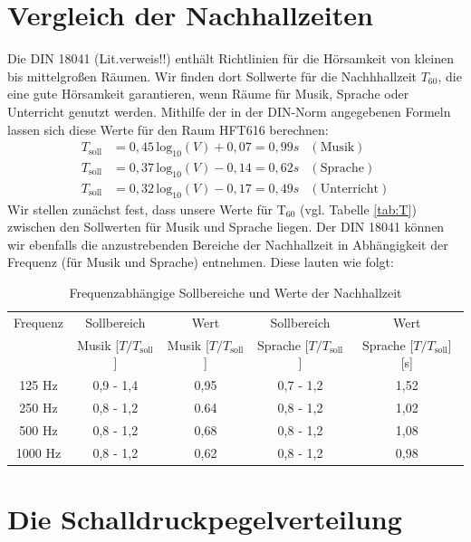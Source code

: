 \section{Vergleich der Nachhallzeiten}
\label{sec:ts}
Die DIN 18041 (Lit.verweis!!) enthält Richtlinien für die Hörsamkeit von kleinen bis mittelgroßen Räumen. 
Wir finden dort Sollwerte für die Nachhhallzeit $T_{60}$, die eine gute Hörsamkeit garantieren, wenn Räume für Musik, Sprache oder Unterricht genutzt werden.
Mithilfe der in der DIN-Norm angegebenen Formeln lassen sich diese Werte für den Raum HFT616 berechnen:
\begin{align*}
T_{\mathrm{soll}} &= 0,45\, \mathrm{log}_{10} (V)+0,07 = 0,99 s & \mathrm{(Musik)}\\
T_{\mathrm{soll}} &= 0,37\, \mathrm{log}_{10} (V)-0,14 = 0,62 s & \mathrm{(Sprache)} \\
T_{\mathrm{soll}} &= 0,32\, \mathrm{log}_{10} (V)-0,17 = 0,49 s& \mathrm{(Unterricht)}
\end{align*}
Wir stellen zunächst fest, dass unsere Werte für T$_60$ (vgl. Tabelle \ref{tab:T}) zwischen den Sollwerten für Musik und Sprache liegen. 
Der DIN 18041 können wir ebenfalls die anzustrebenden Bereiche der Nachhallzeit in Abhängigkeit der Frequenz (für Musik und Sprache) entnehmen. Diese lauten wie folgt:
\begin{table}[H]
    \centering
    \caption{Frequenzabhängige Sollbereiche und Werte der Nachhallzeit}
    \label{tab:Tsoll}
    \begin{tabular}[\textwidth]{|c|c|c|c|c|}
    \hline
        Frequenz & Sollbereich& Wert&Sollbereich &Wert\\
        & Musik [$T/T_{\mathrm{soll}}$] & Musik [$T/T_{\mathrm{soll}}$] & Sprache [$T/T_{\mathrm{soll}}$]  & Sprache [$T/T_{\mathrm{soll}}$] [s] \\
        \hline
        125 Hz &0,9 - 1,4 & 0,95 &0,7 - 1,2  & 1,52  \\
        250 Hz &0,8 - 1,2 & 0.64 &0,8 - 1,2 & 1,02 \\
        500 Hz &0,8 - 1,2 &0,68 &0,8 - 1,2 &1,08 \\
        1000 Hz & 0,8 - 1,2 & 0,62& 0,8 - 1,2& 0,98 \\
        \hline
    \end{tabular}
\end{table}


\section{Die Schalldruckpegelverteilung}
\label{sec:sdpv}